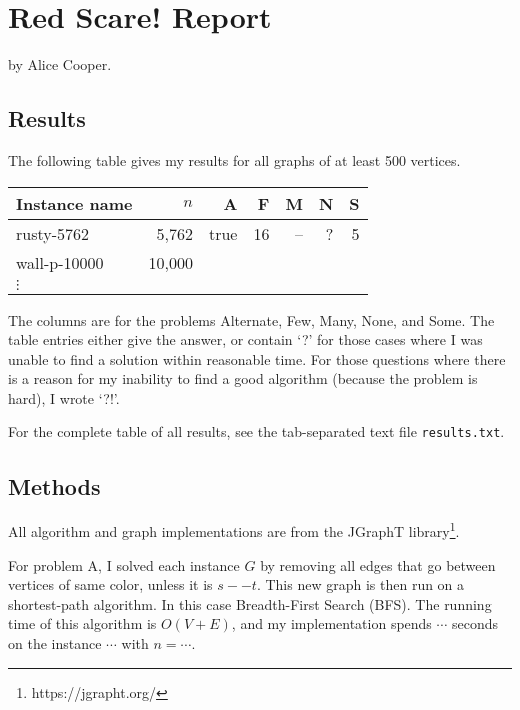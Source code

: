 \documentclass{tufte-handout}
\begin{document}
\section{Red Scare! Report}

by Alice Cooper.

\subsection{Results}

The following table gives my results for all graphs of at least 500 vertices.

\medskip
\begin{tabular}{lrrrrrr}
  \toprule
  Instance name & $n$ & A & F & M & N & S \\
  \midrule
  rusty-5762 & 5,762 & true & 16 & -- & ? & 5 \\
  wall-p-10000 & 10,000 &\\	
  $\vdots$\\
  \bottomrule
\end{tabular}
\medskip

The columns are for the problems Alternate, Few, Many, None, and Some.
The table entries either give the answer, or contain `?' for those cases where I was unable to find a solution within reasonable time.
For those questions where there is a reason for my inability to find a good algorithm (because the problem is hard), I wrote `?!'.

For the complete table of all results, see the tab-separated text file {\tt results.txt}.

\subsection{Methods}
All algorithm and graph implementations are from the JGraphT library\footnote{https://jgrapht.org/}.

For problem A, I solved each instance $G$ by removing all edges that go between vertices of same color, unless it is $s -- t$. This new graph is then run on a shortest-path algorithm. In this case Breadth-First Search (BFS).
The running time of this algorithm is $O(V + E)$, and my implementation spends $\cdots$ seconds on the instance $\cdots$ with  $n=\cdots$.
\end{document}

